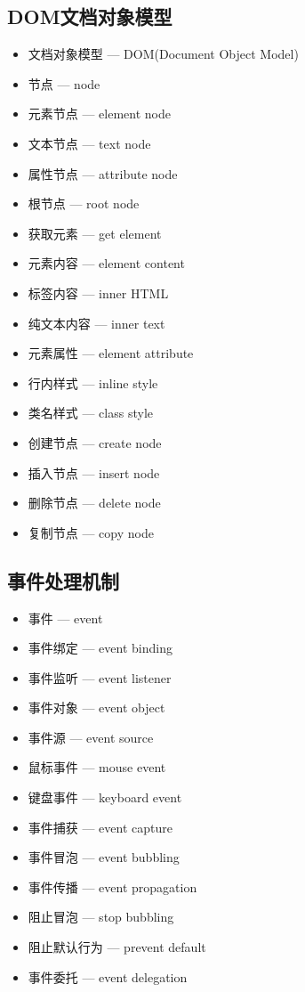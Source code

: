 \subsection{DOM文档对象模型}
\begin{itemize}
\item 文档对象模型 — DOM(Document Object Model)
\item 节点 — node
\item 元素节点 — element node
\item 文本节点 — text node
\item 属性节点 — attribute node
\item 根节点 — root node
\item 获取元素 — get element
\item 元素内容 — element content
\item 标签内容 — inner HTML
\item 纯文本内容 — inner text
\item 元素属性 — element attribute
\item 行内样式 — inline style
\item 类名样式 — class style
\item 创建节点 — create node
\item 插入节点 — insert node
\item 删除节点 — delete node
\item 复制节点 — copy node
\end{itemize}

\subsection{事件处理机制}
\begin{itemize}
\item 事件 — event
\item 事件绑定 — event binding
\item 事件监听 — event listener
\item 事件对象 — event object
\item 事件源 — event source
\item 鼠标事件 — mouse event
\item 键盘事件 — keyboard event
\item 事件捕获 — event capture
\item 事件冒泡 — event bubbling
\item 事件传播 — event propagation
\item 阻止冒泡 — stop bubbling
\item 阻止默认行为 — prevent default
\item 事件委托 — event delegation
\end{itemize}

